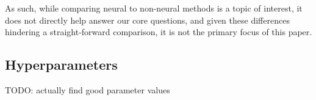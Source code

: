 \documentclass{article}
\begin{document}



As such, while comparing neural to non-neural methods is a topic of interest,
it does not directly help answer our core questions,
and given
these differences hindering a straight-forward comparison,
it is not the primary focus of this paper.

\subsection{Hyperparameters}

  TODO: actually find good parameter values
\end{document}
